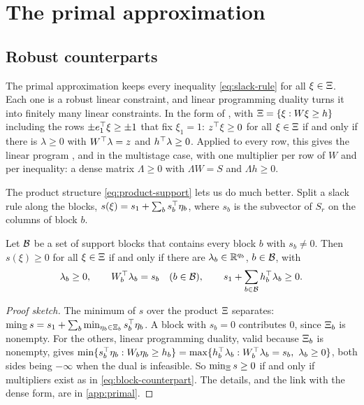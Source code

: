 \section{The primal approximation}
\label{sec:primal}

\subsection{Robust counterparts}

The primal approximation keeps every inequality \eqref{eq:slack-rule} for all $\xi \in \Xi$.
Each one is a robust linear constraint, and linear programming duality turns it into finitely many linear constraints.
In the form of \citet[Proposition~1]{KWG2011}, with $\Xi = \{\xi : W\xi \ge h\}$ including the rows $\pm e_1^\top\xi \ge \pm1$ that fix $\xi_1 = 1$:
$z^\top\xi \ge 0$ for all $\xi\in\Xi$ if and only if there is $\lambda \ge 0$ with $W^\top\lambda = z$ and $h^\top\lambda \ge 0$.
Applied to every row, this gives the linear program \citet[(2.3)]{KWG2011}, and \citet[(4.2)]{KWG2011} in the multistage case,
with one multiplier per row of $W$ and per inequality: a dense matrix $\Lambda \ge 0$ with $\Lambda W = S$ and $\Lambda h \ge 0$.

The product structure \eqref{eq:product-support} lets us do much better.
Split a slack rule along the blocks, $s(\xi) = s_1 + \sum_b s_b^\top \eta_b$, where $s_b$ is the subvector of $S_r$ on the columns of block $b$.

\begin{proposition}
\label{prop:block-counterpart}
Let $\mathcal{B}$ be a set of support blocks that contains every block $b$ with $s_b \neq 0$.
Then $s(\xi) \ge 0$ for all $\xi \in \Xi$ if and only if there are $\lambda_b \in \mathbb{R}^{q_b}$, $b \in \mathcal{B}$, with
\begin{equation}
\label{eq:block-counterpart}
\lambda_b \ge 0, \qquad W_b^\top \lambda_b = s_b \quad (b \in \mathcal{B}), \qquad s_1 + \sum_{b \in \mathcal{B}} h_b^\top \lambda_b \ge 0.
\end{equation}
\end{proposition}

\begin{proof}[Proof sketch]
The minimum of $s$ over the product $\Xi$ separates:
$\min_{\Xi} s = s_1 + \sum_b \min_{\eta_b \in \Xi_{b}} s_b^\top\eta_b$.
A block with $s_b = 0$ contributes $0$, since $\Xi_{b}$ is nonempty.
For the others, linear programming duality, valid because $\Xi_{b}$ is nonempty, gives
$\min\{ s_b^\top\eta_b : W_b\eta_b \ge h_b\} = \max\{ h_b^\top\lambda_b : W_b^\top\lambda_b = s_b,\ \lambda_b \ge 0\}$,
both sides being $-\infty$ when the dual is infeasible.
So $\min_\Xi s \ge 0$ if and only if multipliers exist as in \eqref{eq:block-counterpart}.
The details, and the link with the dense form, are in \cref{app:primal}.
\end{proof}

